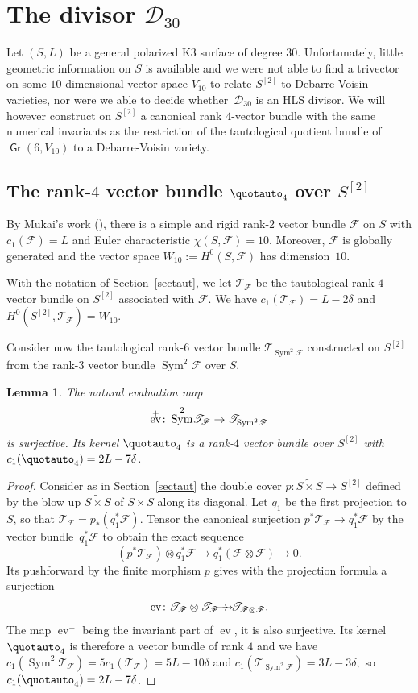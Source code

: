 \documentclass[JEP,XML,SOM,Unicode, NoEqCountersInSection,NoFloatCountersInSection]{cedram}
\let\mathcal\mathscr
\newcommand{\onto}{\mathchoice{\to\hspace*{-5mm}\to}{\to\hspace*{-2.85mm}\to}{\to\hspace*{-3mm}\to}{\to\hspace*{-3mm}\to}}
\newtheorem{lemm}{Lemma}[section]
\theoremstyle{definition}
\newcommand\cD{\mathcal{D}}
\newcommand\cF{\mathcal{F}}
\newcommand\cT{\mathcal{T}}
\DeclareMathOperator{\Gr}{\mathsf{Gr}}
\let\Ld L
\DeclareMathOperator{\ev}{ev}
\DeclareMathOperator{\Sym}{Sym}
\newcommand\Tauto[1]{\cT_{#1}}
\newcommand\hilbS{S^{[2]}}
\newcommand\isospecS{\widetilde{S\times S}}
\begin{document}
\section{The divisor \texorpdfstring{$\cD_{30}$}{D30}}\label{ch8}

Let $(S,L)$ be a general polarized K3 surface of degree $30$. Unfortunately, little geometric information on $S$ is available and we
were not able to find a trivector on some $10$-dimensional vector space
$V_{10}$ to relate $\hilbS$ to Debarre-Voisin varieties, nor were we able to decide whether~$\cD_{30}$ is an HLS divisor. We will however construct on $\hilbS$ a canonical rank $4$-vector bundle with the same numerical invariants as the restriction of the
tautological quotient bundle of $\Gr(6,V_{10})$ to a Debarre-Voisin variety.

\subsection{The rank-$4$ vector bundle $\quotauto_4$ over $\hilbS$}\label{g16Q4}
By Mukai's work (\cite{mukai2}), there is a simple and rigid \mbox{rank-$2$} vector bundle $\cF$ on $S$ with $c_1(\cF)=L$ and
Euler characteristic $\chi(S,\cF)=10$. Moreover, $\cF$ is globally generated and the vector space
$W_{10}:=H^0(S,\cF)$ has dimension~$10$.

With the notation of Section~\ref{sectaut}, we let $\Tauto{\cF}$ be the tautological rank-$4$ vector bundle on $\hilbS$
associated with $\cF$.
We have $c_1(\Tauto{\cF})=\Ld-2\delta$ and $H^0(\hilbS,\Tauto{\cF})=W_{10}$.

Consider now the tautological rank-$6$ vector bundle $\Tauto{\Sym^2\! \cF}$ constructed
on $\hilbS$ from the rank-$3$ vector bundle $\Sym^2\! \cF$ over $S$.

\begin{lemm}\label{defE4}
The natural evaluation map\vspace*{-3pt}
\[
\ev^+\colon \Sym^2\! \Tauto{\cF} \to \Tauto{\Sym^2\!\cF}\vspace*{-3pt}
\]
is surjective. Its kernel $\quotauto_4$ is a rank-$4$ vector bundle over $\hilbS$
with $c_1(\quotauto_4) = 2\Ld-7\delta$.
\end{lemm}

\begin{proof}
Consider as in Section~\ref{sectaut} the double cover $p:\isospecS \to \hilbS $
defined by the blow up $\isospecS$ of $S\times S$ along its diagonal. Let $q_1$
be the first projection to $S$, so that $\Tauto{\cF}=p_*(q_1^*\cF)$. Tensor the canonical surjection $p^*\Tauto{\cF} \to q_1^* \cF$ by the vector bundle~$q_1^* \cF$ to obtain the exact sequence
\[
(p^*\Tauto{\cF}) \otimes q_1^* \cF \to q_1^* (\cF \otimes \cF) \to 0.
\]
Its pushforward by the finite morphism $p$ gives with the projection
formula a surjection
\[
\ev\colon \Tauto{\cF} \otimes \Tauto{\cF} \onto \Tauto{\cF \otimes \cF}.
\]
The map $\ev^+$ being the invariant part of $\ev$, it is also
surjective. Its kernel $\quotauto_4$ is therefore a vector bundle of rank $4$ and
we have
$c_1(\Sym^2\! \Tauto{\cF} )=5c_1 (\Tauto{\cF})=5\Ld-10\delta$
and $c_1(\Tauto{\Sym^2\!\cF})=3\Ld-3\delta,$
so $c_1(\quotauto_4)=2\Ld-7\delta$.
\end{proof}
\end{document}
